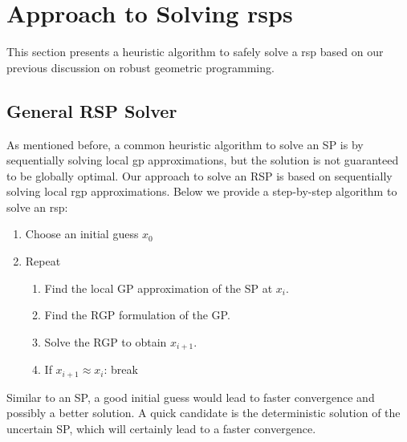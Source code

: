 \section{Approach to Solving \gls{rsp}s}

This section presents a heuristic algorithm to safely solve a \gls{rsp}
based on our previous discussion on robust geometric programming.

\subsection{General RSP Solver}
As mentioned before, a common heuristic algorithm to solve an SP is
by sequentially solving local \gls{gp} approximations, but the solution is not guaranteed
to be globally optimal. Our approach to solve an RSP is based on sequentially solving
local \gls{rgp} approximations. Below we provide a step-by-step algorithm to solve an \gls{rsp}:

\begin{enumerate}
    \item Choose an initial guess $x_0$
    \item Repeat
    \begin{enumerate}
        \item Find the local GP approximation of the SP at $x_i$.
        \item Find the RGP formulation of the GP.
        \item Solve the RGP to obtain $x_{i+1}$.
        \item If $x_{i+1} \approx x_{i}$: break
    \end{enumerate}
\end{enumerate}

Similar to an SP, a good initial guess would lead to faster convergence and possibly a better solution.
A quick candidate is the deterministic solution of the uncertain SP, which will certainly lead to a faster convergence.

